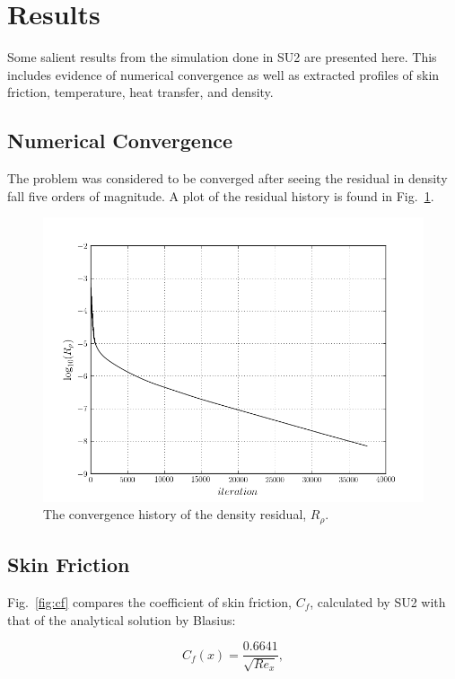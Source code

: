 \documentclass[12pt,letterpaper]{article}
\begin{document}
\section*{Results}
Some salient results from the simulation done in SU2 are presented here. This includes evidence of numerical convergence as well as extracted profiles of skin friction, temperature, heat transfer, and density.

\subsection*{Numerical Convergence}
The problem was considered to be converged after seeing the residual in density fall five orders of magnitude. A plot of the residual history is found in Fig.~\ref{fig:rho_res}.

\begin{figure}[h] 
\centering
\includegraphics[width=\linewidth]{rho_residual.png}
\caption{The convergence history of the density residual, $R_\rho$.}
\label{fig:rho_res}
\end{figure}

\subsection*{Skin Friction}
Fig.~\ref{fig:cf} compares the coefficient of skin friction, $C_f$, calculated by SU2 with that of the analytical solution by Blasius:

\begin{equation*}
C_f(x) = \dfrac{0.6641}{\sqrt{Re_x}},
\end{equation*}
\end{document}
